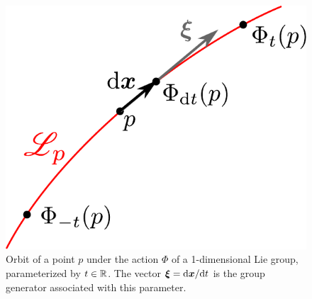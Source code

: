\begin{figure}
\centerline{\includegraphics[height=0.25\textheight]{def_orbit_group.pdf}}
\caption[]{\label{f:neh:orbit_group} \footnotesize
Orbit of a point $p$ under the action $\Phi$ of a 1-dimensional Lie group, parameterized
by $t\in\mathbb{R}$. The vector $\bm{\xi} = \mathrm{d}\bm{x}/\mathrm{d} t$ is the group
generator associated with this parameter.}
\end{figure}

